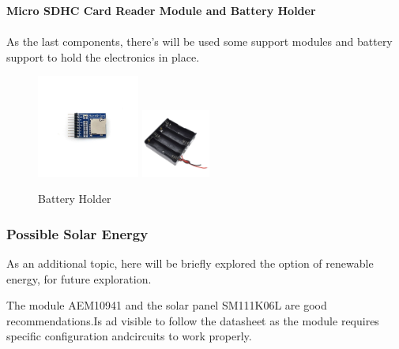 \textbf{Micro SDHC Card Reader Module and Battery Holder}\\\\
As the last components, there's will be used some support modules and battery 
support to hold the electronics in place.

\begin{figure}[H]
    \centering
    \includegraphics[width=0.3\textwidth]{images/chapter/design/components/sd_support.jpg}  %
    \label{fig:Módulo leitor de cartões micro SD}        
    \hspace{0.1cm}
    \includegraphics[width=0.2\textwidth]{images/chapter/design/components/battery-holder.jpg}  %
    \caption{Battery Holder}
    \label{fig:Battery Holder}        
\end{figure}



\subsubsection{Possible Solar Energy}
As an additional topic, here will be briefly explored the option of renewable
energy, for future exploration.

The module AEM10941 and the solar panel SM111K06L are good recommendations.Is ad
visible to follow the datasheet as the module requires specific configuration andcircuits 
to work properly.


